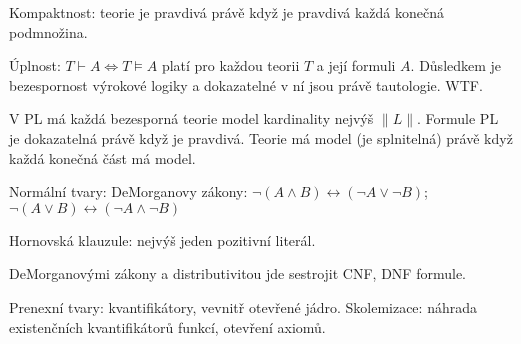 Kompaktnost: teorie je pravdivá právě když je pravdivá každá konečná podmnožina.

Úplnost: $T\vdash A\Leftrightarrow T\vDash A$ platí pro každou teorii $T$ a její
formuli $A$. Důsledkem je bezespornost výrokové logiky a dokazatelné v ní jsou
právě tautologie. WTF.

V PL má každá bezesporná teorie model kardinality nejvýš $\|L\|$.
Formule PL je dokazatelná právě když je pravdivá.
Teorie má model (je splnitelná) právě když každá konečná část má model.

Normální tvary:
DeMorganovy zákony: $\neg(A\wedge B)\leftrightarrow(\neg A\vee\neg B)$;
	$\neg(A\vee B)\leftrightarrow(\neg A\wedge\neg B)$

Hornovská klauzule: nejvýš jeden pozitivní literál.

DeMorganovými zákony a distributivitou jde sestrojit CNF, DNF formule.

Prenexní tvary: kvantifikátory, vevnitř otevřené jádro.
Skolemizace: náhrada existenčních kvantifikátorů funkcí, otevření axiomů.
